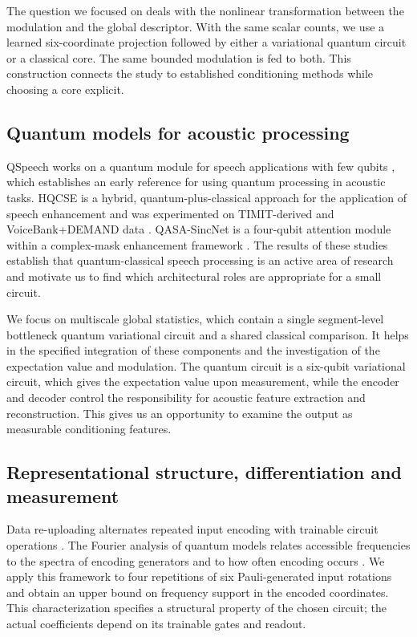 \documentclass[10pt,a4paper]{article}
\begin{document}
The question we focused on deals with the nonlinear transformation between the modulation and the global descriptor. With the same scalar counts, we use a learned six-coordinate projection followed by either a variational quantum circuit or a classical core. The same bounded modulation is fed to both. This construction connects the study to established conditioning methods while choosing a core explicit.

\subsection{Quantum models for acoustic processing}
QSpeech works on a quantum module for speech applications with few qubits \cite{qspeech}, which establishes an early reference for using quantum processing in acoustic tasks. HQCSE is a hybrid, quantum-plus-classical approach for the application of speech enhancement and was experimented on TIMIT-derived and VoiceBank+DEMAND data \cite{hqcse}. QASA-SincNet is a four-qubit attention module within a complex-mask enhancement framework \cite{qasa}. The results of these studies establish that quantum-classical speech processing is an active area of research and motivate us to find which architectural roles are appropriate for a small circuit.

We focus on multiscale global statistics, which contain a single segment-level bottleneck quantum variational circuit and a shared classical comparison. It helps in the specified integration of these components and the investigation of the expectation value and modulation. The quantum circuit is a six-qubit variational circuit, which gives the expectation value upon measurement, while the encoder and decoder control the responsibility for acoustic feature extraction and reconstruction. This gives us an opportunity to examine the output as measurable conditioning features. 

\subsection{Representational structure, differentiation and measurement}
Data re-uploading alternates repeated input encoding with trainable circuit operations \cite{reupload}. The Fourier analysis of quantum models relates accessible frequencies to the spectra of encoding generators and to how often encoding occurs \cite{fourier}. We apply this framework to four repetitions of six Pauli-generated input rotations and obtain an upper bound on frequency support in the encoded coordinates. This characterization specifies a structural property of the chosen circuit; the actual coefficients depend on its trainable gates and readout.
\end{document}
